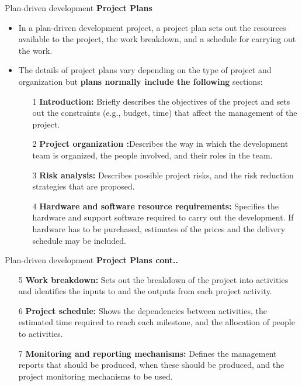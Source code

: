 \documentclass{beamer}
\begin{document}
\begin{frame}{Plan-driven development}
	\textbf{Project Plans}
	\begin{itemize}
		\item In a plan-driven development project, a project plan sets out the resources available to the project, the work breakdown, and a schedule for carrying out the work. 
		
		\item The details of project plans vary depending on the type of project and organization but \textbf{plans normally include the following} sections:
		\begin{itemize}
			\item[1] \textbf{Introduction:} Briefly describes the objectives of the project and sets out the constraints (e.g., budget, time) that affect the management of the project.
			
			\item[2] \textbf{Project organization :}Describes the way in which the development team is organized, the people involved, and their roles in the team.
			\item[3] \textbf{Risk analysis:} Describes possible project risks, and the risk reduction strategies that are proposed.
			\item[4] \textbf{Hardware and software resource requirements:} Specifies the hardware and support software required to carry out the development. If hardware has to be purchased, estimates of the prices and the delivery schedule may be included.
		\end{itemize}
	\end{itemize}
\end{frame}
\begin{frame}{Plan-driven development}
	\textbf{Project Plans cont..}
	\begin{itemize}
	
			\item[5] \textbf{Work breakdown:} Sets out the breakdown of the project into activities and identifies the inputs to and the outputs from each project activity.
			\item[6] \textbf{Project schedule:} Shows the dependencies between activities, the estimated time required to 
			reach each milestone, and the allocation of people to activities. 
			\item[7] \textbf{Monitoring and reporting mechanisms:} Defines the management reports that should be 
			produced, when these should be produced, and the project monitoring mechanisms to be used.
		\end{itemize}

\end{frame}
\end{document}
